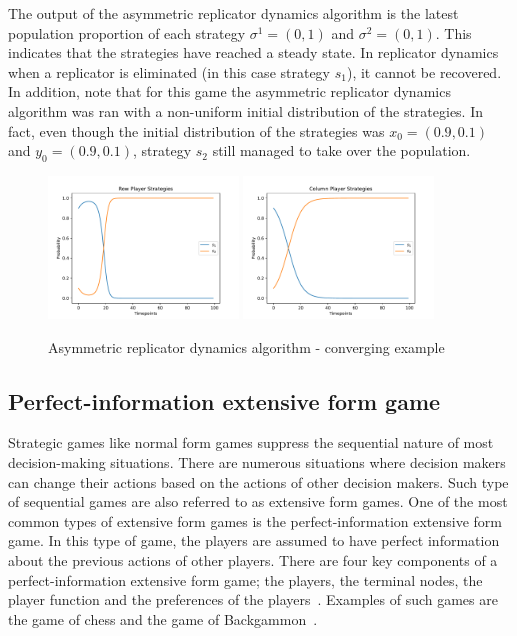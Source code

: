 The output of the asymmetric replicator dynamics algorithm is the latest
population proportion of each strategy \(\sigma^1 = (0, 1)\) and
\(\sigma^2 = (0, 1)\).
This indicates that the strategies have reached a steady state.
In replicator dynamics when a replicator is eliminated (in this case strategy
\(s_1\)), it cannot be recovered.
In addition, note that for this game the asymmetric replicator dynamics
algorithm was ran with a non-uniform initial distribution of the strategies.
In fact, even though the initial distribution of the strategies was
\(x_0 = (0.9, 0.1)\) and \(y_0 = (0.9, 0.1)\), strategy \(s_2\) still managed
to take over the population.

\begin{figure}[H]
    \centering
    \includegraphics[width=0.45\textwidth]{chapters/04_game_theoretic_model/img/learning_algorithms_example/asymmetric_rd_2_row.pdf}
    \includegraphics[width=0.45\textwidth]{chapters/04_game_theoretic_model/img/learning_algorithms_example/asymmetric_rd_2_col.pdf}
    \caption{Asymmetric replicator dynamics algorithm - converging example}
    \label{fig:asymmetric_replicator_dynamics_steady}
\end{figure}


\subsection{Perfect-information extensive form game}

Strategic games like normal form games suppress the sequential nature of most
decision-making situations.
There are numerous situations where decision makers can change their actions
based on the actions of other decision makers.
Such type of sequential games are also referred to as extensive form games.
One of the most common types of extensive form games is the perfect-information
extensive form game.
In this type of game, the players are assumed to have perfect information
about the previous actions of other
players.
There are four key components of a perfect-information extensive form game; the
players, the terminal nodes, the player function and the preferences of the
players~\cite{osborne2004_extensive_form_games}.
Examples of such games are the game of chess and the game of
Backgammon~\cite{hart1992games}.

